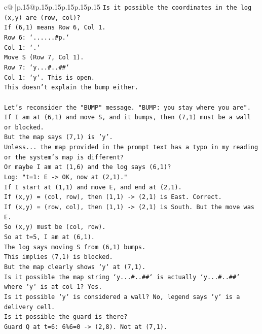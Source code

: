 \documentclass{article}
\begin{document}
{\begin{supertabular}{c@{$\;$}|p{.15\linewidth}@{}p{.15\linewidth}p{.15\linewidth}p{.15\linewidth}p{.15\linewidth}p{.15\linewidth}}
{{{\texttt{Is it possible the coordinates in the log (x,y) are (row, col)?} \\
\texttt{If (6,1) means Row 6, Col 1.} \\
\texttt{Row 6: `......\#p.`} \\
\texttt{Col 1: `.`} \\
\texttt{Move S (Row 7, Col 1).} \\
\texttt{Row 7: `y...\#..\#\#`} \\
\texttt{Col 1: `y`. This is open.} \\
\texttt{This doesn't explain the bump either.} \\
\\ 
\texttt{Let's reconsider the "BUMP" message. "BUMP: you stay where you are".} \\
\texttt{If I am at (6,1) and move S, and it bumps, then (7,1) must be a wall or blocked.} \\
\texttt{But the map says (7,1) is 'y'.} \\
\texttt{Unless... the map provided in the prompt text has a typo in my reading or the system's map is different?} \\
\texttt{Or maybe I am at (1,6) and the log says (6,1)?} \\
\texttt{Log: "t=1: E {-}> OK, now at (2,1)."} \\
\texttt{If I start at (1,1) and move E, and end at (2,1).} \\
\texttt{If (x,y) = (col, row), then (1,1) {-}> (2,1) is East. Correct.} \\
\texttt{If (x,y) = (row, col), then (1,1) {-}> (2,1) is South. But the move was E.} \\
\texttt{So (x,y) must be (col, row).} \\
\texttt{So at t=5, I am at (6,1).} \\
\texttt{The log says moving S from (6,1) bumps.} \\
\texttt{This implies (7,1) is blocked.} \\
\texttt{But the map clearly shows `y` at (7,1).} \\
\texttt{Is it possible the map string `y...\#..\#\#` is actually `y...\#..\#\#` where `y` is at col 1? Yes.} \\
\texttt{Is it possible `y` is considered a wall? No, legend says `y` is a delivery cell.} \\
\texttt{Is it possible the guard is there?} \\
\texttt{Guard Q at t=6: 6\%6=0 {-}> (2,8). Not at (7,1).} \\
}}}
\end{supertabular}}
\end{document}
